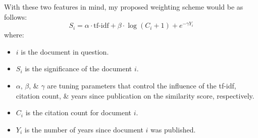 \documentclass[a4paper]{article}
\begin{document}
With these two features in mind, my proposed weighting scheme would be as follows:
\[
    S_i = \alpha \cdot \text{tf-idf} + \beta \cdot \log(C_i + 1) + e^{- \gamma Y_i}
\]
where:
\begin{itemize}
    \item   $i$ is the document in question.
    \item   $S_i$ is the significance of the document $i$.
    \item   $\alpha$, $\beta$, \& $\gamma$ are tuning parameters that control the influence of the tf-idf, citation count, \& years since publication on the similarity score, respectively.
    \item   $C_i$ is the citation count for document $i$.
    \item   $Y_i$ is the number of years since document $i$ was published.
\end{itemize}



\newpage
\nocite{*}
\printbibliography
\end{document}
